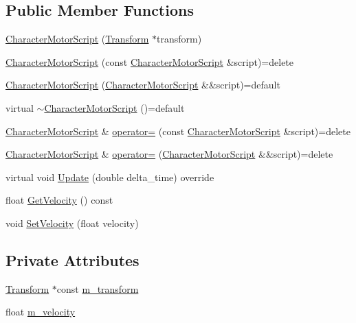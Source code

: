 \subsection*{Public Member Functions}
\begin{DoxyCompactItemize}
\item 
\hyperlink{classmage_1_1_character_motor_script_af819140d0ebda767e9b82826c50972de}{Character\+Motor\+Script} (\hyperlink{structmage_1_1_transform}{Transform} $\ast$transform)
\item 
\hyperlink{classmage_1_1_character_motor_script_aa8b4b2c6eba7077677db51e24c2a9a36}{Character\+Motor\+Script} (const \hyperlink{classmage_1_1_character_motor_script}{Character\+Motor\+Script} \&script)=delete
\item 
\hyperlink{classmage_1_1_character_motor_script_a944682d8ff570a141e60cdd2d16aa3ad}{Character\+Motor\+Script} (\hyperlink{classmage_1_1_character_motor_script}{Character\+Motor\+Script} \&\&script)=default
\item 
virtual \hyperlink{classmage_1_1_character_motor_script_a03e8cdb2e30e21fe3a84f36101a169e3}{$\sim$\+Character\+Motor\+Script} ()=default
\item 
\hyperlink{classmage_1_1_character_motor_script}{Character\+Motor\+Script} \& \hyperlink{classmage_1_1_character_motor_script_a5b66cbbe6b829fe56a1bba5f9093b36e}{operator=} (const \hyperlink{classmage_1_1_character_motor_script}{Character\+Motor\+Script} \&script)=delete
\item 
\hyperlink{classmage_1_1_character_motor_script}{Character\+Motor\+Script} \& \hyperlink{classmage_1_1_character_motor_script_a05e8822fa633d8642702d125b26069f7}{operator=} (\hyperlink{classmage_1_1_character_motor_script}{Character\+Motor\+Script} \&\&script)=delete
\item 
virtual void \hyperlink{classmage_1_1_character_motor_script_af09581e810c02ca4a19ecbaf0d7580bb}{Update} (double delta\+\_\+time) override
\item 
float \hyperlink{classmage_1_1_character_motor_script_a0c512015222e3f332429df414c06862b}{Get\+Velocity} () const
\item 
void \hyperlink{classmage_1_1_character_motor_script_a3fd91c324e837b9d22e19d74478caec0}{Set\+Velocity} (float velocity)
\end{DoxyCompactItemize}
\subsection*{Private Attributes}
\begin{DoxyCompactItemize}
\item 
\hyperlink{structmage_1_1_transform}{Transform} $\ast$const \hyperlink{classmage_1_1_character_motor_script_a7331e960455b72ceb858254ccc7108f1}{m\+\_\+transform}
\item 
float \hyperlink{classmage_1_1_character_motor_script_a02441cc4c84ba12811845b7f966f4069}{m\+\_\+velocity}
\end{DoxyCompactItemize}
